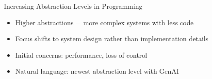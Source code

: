 \documentclass{beamer}
\begin{document}
\begin{frame}{Increasing Abstraction Levels in Programming}
    \begin{center}
    \end{center}

    \begin{itemize}
        \item Higher abstractions = more complex systems with less code
        \item Focus shifts to system design rather than implementation details
        \item Initial concerns: performance, loss of control
        \item Natural language: newest abstraction level with GenAI
    \end{itemize}
\end{frame}
\end{document}
